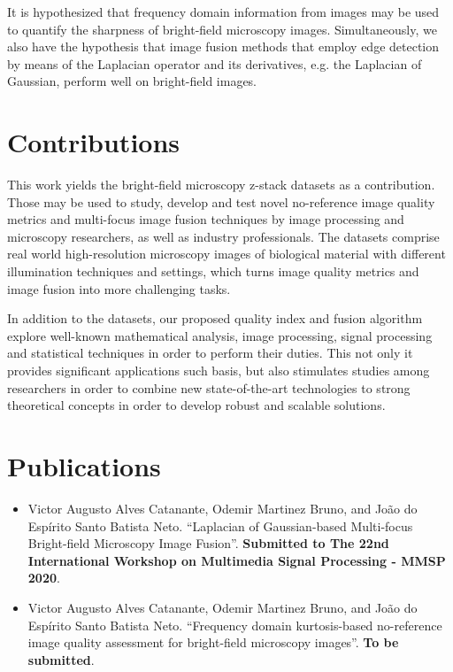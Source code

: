 It is hypothesized that frequency domain information from images may be used to quantify the sharpness of bright-field microscopy images. Simultaneously, we also have the hypothesis that image fusion methods that employ edge detection by means of the Laplacian operator and its derivatives, e.g. the Laplacian of Gaussian, perform well on bright-field images. 

\section{Contributions}

This work yields the bright-field microscopy z-stack datasets as a contribution. Those may be used to study, develop and test novel no-reference image quality metrics and multi-focus image fusion techniques by image processing and microscopy researchers, as well as industry professionals. The datasets comprise real world high-resolution microscopy images of biological material with different illumination techniques and settings, which turns image quality metrics and image fusion into more challenging tasks.

In addition to the datasets, our proposed quality index and fusion algorithm explore well-known mathematical analysis, image processing, signal processing and statistical techniques in order to perform their duties. This not only it provides significant applications such basis, but also stimulates studies among researchers in order to combine new state-of-the-art technologies to strong theoretical concepts in order to develop robust and scalable solutions.

\section*{Publications}

\begin{itemize}
    \item Victor Augusto Alves Catanante, Odemir Martinez Bruno, and João do Espírito Santo Batista Neto. ``Laplacian of Gaussian-based Multi-focus Bright-field Microscopy Image Fusion''. \textbf{Submitted to The 22nd International Workshop on Multimedia Signal Processing - MMSP 2020}.
    
    \item \cite{catanante2020frequency} Victor Augusto Alves Catanante, Odemir Martinez Bruno, and João do Espírito Santo Batista Neto. ``Frequency domain kurtosis-based no-reference image quality assessment for bright-field microscopy images''. \textbf{To be submitted}.
\end{itemize}

